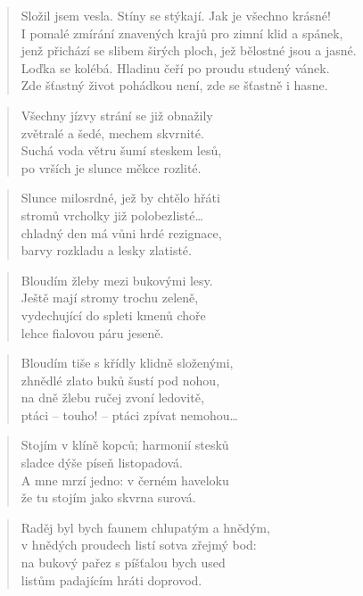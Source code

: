 \documentclass{book}
\begin{document}
\begin{verse}
Složil jsem vesla. Stíny se stýkají. Jak je všechno krásné!\\
I pomalé zmírání znavených krajů pro zimní klid a spánek,\\
jenž přichází se slibem širých ploch, jež bělostné jsou a jasné.\\
Loďka se kolébá. Hladinu čeří po proudu studený vánek.\\
Zde šťastný život pohádkou není, zde se šťastně i hasne.
\end{verse}
\newpage
{}
\begin{verse}
Všechny jízvy strání se již obnažily\\
zvětralé a šedé, mechem skvrnité.\\
Suchá voda větru šumí steskem lesů,\\
po vrších je slunce měkce rozlité.
\end{verse}
\begin{verse}
Slunce milosrdné, jež by chtělo hřáti\\
stromů vrcholky již polobezlisté\ldots\\
chladný den má vůni hrdé rezignace,\\
barvy rozkladu a lesky zlatisté.
\end{verse}
\begin{verse}
Bloudím žleby mezi bukovými lesy.\\
Ještě mají stromy trochu zeleně,\\
vydechující do spleti kmenů choře\\
lehce fialovou páru jeseně.
\end{verse}
\begin{verse}
Bloudím tiše s křídly klidně složenými,\\
zhnědlé zlato buků šustí pod nohou,\\
na dně žlebu ručej zvoní ledovitě,\\
ptáci -- touho! -- ptáci zpívat nemohou\ldots
\end{verse}
\begin{verse}
Stojím v klíně kopců; harmonií stesků\\
sladce dýše píseň listopadová.\\
A mne mrzí jedno: v černém haveloku\\
že tu stojím jako skvrna surová.
\end{verse}
\begin{verse}
Raděj byl bych faunem chlupatým a hnědým,\\
v hnědých proudech listí sotva zřejmý bod:\\
na bukový pařez s píšťalou bych used\\
listům padajícím hráti doprovod.
\end{verse}
\end{document}
